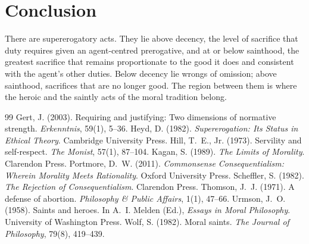 \documentclass{situationist-preprint}
\begin{document}
\section{Conclusion}

There are supererogatory acts. They lie above decency, the level of sacrifice that duty requires given an agent-centred prerogative, and at or below sainthood, the greatest sacrifice that remains proportionate to the good it does and consistent with the agent's other duties. Below decency lie wrongs of omission; above sainthood, sacrifices that are no longer good. The region between them is where the heroic and the saintly acts of the moral tradition belong.

\begin{thebibliography}{99}\small
{} Gert, J. (2003). Requiring and justifying: Two dimensions of normative strength. \emph{Erkenntnis}, 59(1), 5--36.
 Heyd, D. (1982). \emph{Supererogation: Its Status in Ethical Theory}. Cambridge University Press.
 Hill, T.~E., Jr. (1973). Servility and self-respect. \emph{The Monist}, 57(1), 87--104.
 Kagan, S. (1989). \emph{The Limits of Morality}. Clarendon Press.
 Portmore, D.~W. (2011). \emph{Commonsense Consequentialism: Wherein Morality Meets Rationality}. Oxford University Press.
 Scheffler, S. (1982). \emph{The Rejection of Consequentialism}. Clarendon Press.
 Thomson, J.~J. (1971). A defense of abortion. \emph{Philosophy \& Public Affairs}, 1(1), 47--66.
 Urmson, J.~O. (1958). Saints and heroes. In A.~I. Melden (Ed.), \emph{Essays in Moral Philosophy}. University of Washington Press.
 Wolf, S. (1982). Moral saints. \emph{The Journal of Philosophy}, 79(8), 419--439.
\end{thebibliography}
\end{document}
